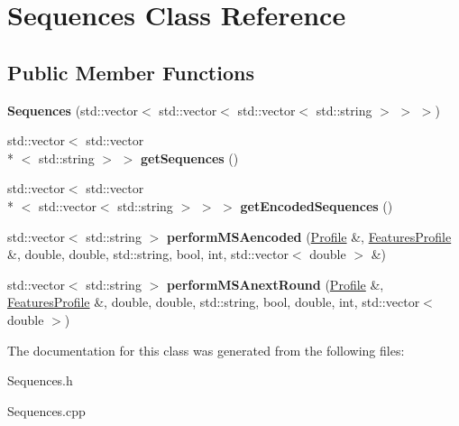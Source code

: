 \hypertarget{class_sequences}{\section{Sequences Class Reference}
\label{class_sequences}
}
\subsection*{Public Member Functions}
\begin{DoxyCompactItemize}
\item 
\hypertarget{class_sequences_a0252033912729e35bdcf2db94126fdef}{{\bfseries Sequences} (std\+::vector$<$ std\+::vector$<$ std\+::vector$<$ std\+::string $>$ $>$ $>$)}\label{class_sequences_a0252033912729e35bdcf2db94126fdef}

\item 
\hypertarget{class_sequences_a4f705dda54009aa1596746df8949e0ab}{std\+::vector$<$ std\+::vector\\*
$<$ std\+::string $>$ $>$ {\bfseries get\+Sequences} ()}\label{class_sequences_a4f705dda54009aa1596746df8949e0ab}

\item 
\hypertarget{class_sequences_add23c77c8ae057b6351a61d63de54898}{std\+::vector$<$ std\+::vector\\*
$<$ std\+::vector$<$ std\+::string $>$ $>$ $>$ {\bfseries get\+Encoded\+Sequences} ()}\label{class_sequences_add23c77c8ae057b6351a61d63de54898}

\item 
\hypertarget{class_sequences_ab857200e99faaa0b93c2d6a695d46b03}{std\+::vector$<$ std\+::string $>$ {\bfseries perform\+M\+S\+Aencoded} (\hyperlink{class_profile}{Profile} \&, \hyperlink{class_features_profile}{Features\+Profile} \&, double, double, std\+::string, bool, int, std\+::vector$<$ double $>$ \&)}\label{class_sequences_ab857200e99faaa0b93c2d6a695d46b03}

\item 
\hypertarget{class_sequences_a58e54486e332b1acc57557a88f515db9}{std\+::vector$<$ std\+::string $>$ {\bfseries perform\+M\+S\+Anext\+Round} (\hyperlink{class_profile}{Profile} \&, \hyperlink{class_features_profile}{Features\+Profile} \&, double, double, std\+::string, bool, double, int, std\+::vector$<$ double $>$)}\label{class_sequences_a58e54486e332b1acc57557a88f515db9}

\end{DoxyCompactItemize}


The documentation for this class was generated from the following files\+:\begin{DoxyCompactItemize}
\item 
Sequences.\+h\item 
Sequences.\+cpp\end{DoxyCompactItemize}
